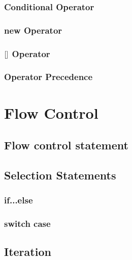 \documentclass[14pt,fleqn]{extbook} %
\newcommand{\s} {
	\hphantom{} \hphantom{} \hphantom{}
}
\begin{document}
\subsection{Conditional Operator}

%
\subsection{new Operator}

\subsection{ $\left[ \s \right]$ Operator}

\subsection{Operator Precedence}


\chapter{Flow Control}
\section{Flow control statement}

\section{Selection Statements}

\subsection{if...else}

\subsection{switch case}

\section{Iteration}

\end{document}
